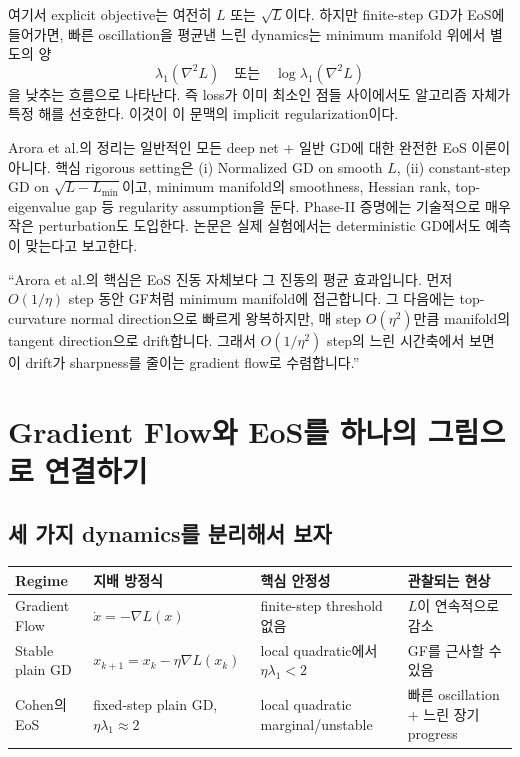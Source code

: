 \documentclass[11pt,a4paper,oneside,openany]{memoir}
\newcommand{\grad}{\nabla}
\newcommand{\Hess}{\nabla^2}
\theoremstyle{definition}
\begin{document}
여기서 explicit objective는 여전히 $L$ 또는 $\sqrt L$이다. 하지만 finite-step GD가 EoS에 들어가면,
빠른 oscillation을 평균낸 느린 dynamics는 minimum manifold 위에서 별도의 양
\begin{equation}
  \lambda_1(\Hess L)
  \quad\text{또는}\quad
  \log\lambda_1(\Hess L)
\end{equation}
을 낮추는 흐름으로 나타난다.
즉 loss가 이미 최소인 점들 사이에서도 알고리즘 자체가 특정 해를 선호한다.
이것이 이 문맥의 implicit regularization이다.

\begin{warningbox}[--- 이론의 적용 범위]
Arora et al.의 정리는 일반적인 모든 deep net + 일반 GD에 대한 완전한 EoS 이론이 아니다.
핵심 rigorous setting은 (i) Normalized GD on smooth $L$, (ii) constant-step GD on $\sqrt{L-L_{\min}}$이고,
minimum manifold의 smoothness, Hessian rank, top-eigenvalue gap 등 regularity assumption을 둔다.
Phase-II 증명에는 기술적으로 매우 작은 perturbation도 도입한다. 논문은 실제 실험에서는 deterministic GD에서도 예측이 맞는다고 보고한다.
\end{warningbox}

\begin{presentbox}
``Arora et al.의 핵심은 EoS 진동 자체보다 그 진동의 평균 효과입니다. 먼저 $O(1/\eta)$ step 동안 GF처럼 minimum manifold에 접근합니다.
그 다음에는 top-curvature normal direction으로 빠르게 왕복하지만, 매 step $O(\eta^2)$만큼 manifold의 tangent direction으로 drift합니다.
그래서 $O(1/\eta^2)$ step의 느린 시간축에서 보면 이 drift가 sharpness를 줄이는 gradient flow로 수렴합니다.''
\end{presentbox}

\chapter{Gradient Flow와 EoS를 하나의 그림으로 연결하기}

\section{세 가지 dynamics를 분리해서 보자}

\begin{center}
\small
\begin{tabularx}{\textwidth}{>{\raggedright\arraybackslash}p{} >{\raggedright\arraybackslash}p{} >{\raggedright\arraybackslash}p{} >{\raggedright\arraybackslash}X}
\toprule
Regime & 지배 방정식 & 핵심 안정성 & 관찰되는 현상 \\
\midrule
Gradient Flow & $\dot x=-\grad L(x)$ & finite-step threshold 없음 & $L$이 연속적으로 감소 \\
Stable plain GD & $x_{k+1}=x_k-\eta\grad L(x_k)$ & local quadratic에서 $\eta\lambda_1<2$ & GF를 근사할 수 있음 \\
Cohen의 EoS & fixed-step plain GD, $\eta\lambda_1\approx2$ & local quadratic marginal/unstable & 빠른 oscillation + 느린 장기 progress \\
\bottomrule
\end{tabularx}
\end{center}
\end{document}
